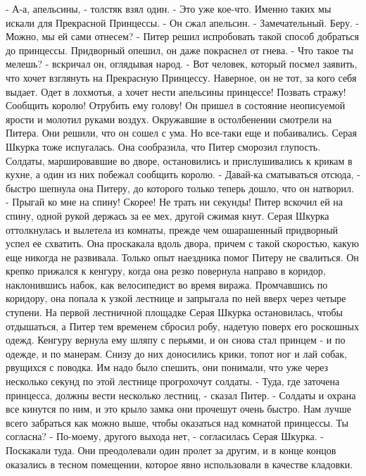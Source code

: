     - А-а, апельсины, - толстяк взял один. - Это уже кое-что. Именно 
таких мы искали для Прекрасной Принцессы. - Он сжал апельсин. - 
Замечательный. Беру.
    - Можно, мы ей сами отнесем? - Питер решил испробовать такой 
способ добраться до принцессы.
    Придворный опешил, он даже покраснел от гнева.
    - Что такое ты мелешь? - вскричал он, оглядывая народ. - Вот 
человек, который посмел заявить, что хочет взглянуть на Прекрасную 
Принцессу. Наверное, он не тот, за кого себя выдает. Одет в лохмотья, 
а хочет нести апельсины принцессе! Позвать стражу! Сообщить королю! 
Отрубить ему голову!
    Он пришел в состояние неописуемой ярости и молотил руками воздух. 
Окружавшие в остолбенении смотрели на Питера. Они решили, что он сошел 
с ума. Но все-таки еще и побаивались.
    Серая Шкурка тоже испугалась. Она сообразила, что Питер сморозил 
глупость. Солдаты, маршировавшие во дворе, остановились и 
прислушивались к крикам в кухне, а один из них побежал сообщить 
королю.
    - Давай-ка сматываться отсюда, - быстро шепнула она Питеру, до 
которого только теперь дошло, что он натворил. - Прыгай ко мне на 
спину! Скорее! Не трать ни секунды!
    Питер вскочил ей на спину, одной рукой держась за ее мех, другой 
сжимая кнут. Серая Шкурка оттолкнулась и вылетела из комнаты, прежде 
чем ошарашенный придворный успел ее схватить.
    Она проскакала вдоль двора, причем с такой скоростью, какую еще 
никогда не развивала. Только опыт наездника помог Питеру не свалиться. 
Он крепко прижался к кенгуру, когда она резко повернула направо в 
коридор, наклонившись набок, как велосипедист во время виража. 
Промчавшись по коридору, она попала к узкой лестнице и запрыгала по 
ней вверх через четыре ступени.
    На первой лестничной площадке Серая Шкурка остановилась, чтобы 
отдышаться, а Питер тем временем сбросил робу, надетую поверх его 
роскошных одежд. Кенгуру вернула ему шляпу с перьями, и он снова стал 
принцем - и по одежде, и по манерам.
    Снизу до них доносились крики, топот ног и лай собак, рвущихся с 
поводка. Им надо было спешить, они понимали, что уже через несколько 
секунд по этой лестнице прогрохочут солдаты.
    - Туда, где заточена принцесса, должны вести несколько лестниц, - 
сказал Питер. - Солдаты и охрана все кинутся по ним, и это крыло замка 
они прочешут очень быстро. Нам лучше всего забраться как можно выше, 
чтобы оказаться над комнатой принцессы. Ты согласна?
    - По-моему, другого выхода нет, - согласилась Серая Шкурка. - 
Поскакали туда.
    Они преодолевали один пролет за другим, и в конце концов оказались 
в тесном помещении, которое явно использовали в качестве кладовки. 
